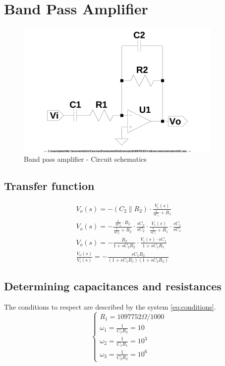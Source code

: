 \documentclass[10pt,a4paper]{article}
\begin{document}
\section{Band Pass Amplifier}

\begin{figure}[H]
  \centering
  \includegraphics[width=10cm]{schematics/2d1.jpg}
  \caption{Band pass amplifier - Circuit schematics}
  \label{2d1schematics}
\end{figure}

\subsection{Transfer function}

\begin{align}
V_o(s) = - (C_2 \parallel R_2) \cdot \frac{V_i(s)}{\frac{1}{sC_1}+R_1} \nonumber \\
V_o(s) = - \frac{\frac{1}{sC_2} \cdot R_2}{\frac{1}{sC_2}+R_2} \cdot \frac{sC_2}{sC_2} \cdot \frac{V_i(s)}{\frac{1}{sC_1}+R_1} \cdot \frac{sC_1}{sC_1} \nonumber \\
V_o(s) = - \frac{R_2}{1+sC_2R_2} \cdot \frac{V_i(s) \cdot sC_1}{1+sC_1R_1} \nonumber \\
\frac{V_o(s)}{V_i(s)} = - \frac{sC_1R_2}{(1+sC_1R_1)(1+sC_2R_2)}
\end{align}

\subsection{Determining capacitances and resistances}
The conditions to respect are described by the system \ref{eq:conditions}.
\begin{equation}
\left\{
\begin{array}{l}
R_1 = 1097752\Omega/1000 \\
\omega_1 = \frac{1}{C_1R_2} = 10 \\
\omega_2 = \frac{1}{C_1R_1} = 10^3 \\
\omega_3 = \frac{1}{C_2R_2} = 10^6
\end{array}
\right. \label{eq:conditions}
\end{equation}
\end{document}
